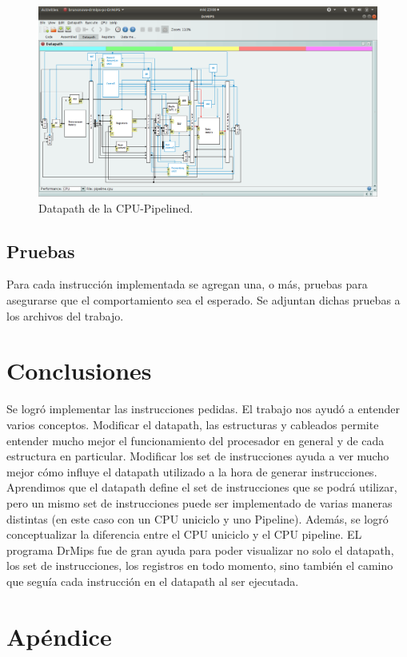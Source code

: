 \documentclass[a4paper, 12pt]{article}
\begin{document}
		\begin{figure}[!h]
	  		\centering
			    \includegraphics[width=\textwidth]{files/cpupipelined.png}
		 	 \caption{Datapath de la CPU-Pipelined.}
	  		\label{fig}
		\end{figure}	
	
	\subsection{Pruebas}
	Para cada instrucción implementada se agregan una, o más, pruebas para asegurarse que el comportamiento sea el esperado. Se adjuntan dichas pruebas a los archivos del trabajo.
	
	
	\section{Conclusiones}
	Se logró implementar las instrucciones pedidas.
	El trabajo nos ayudó a entender varios conceptos. Modificar el datapath, las estructuras y cableados permite entender mucho mejor el funcionamiento del procesador en general y de cada estructura en particular. Modificar los set de instrucciones ayuda a ver mucho mejor cómo influye el datapath utilizado a la hora de generar instrucciones. Aprendimos que el datapath define el set de instrucciones que se podrá utilizar, pero un mismo set de instrucciones puede ser implementado de varias maneras distintas (en este caso con un CPU uniciclo y uno Pipeline). Además, se logró conceptualizar la diferencia entre el CPU uniciclo y el CPU pipeline.
	EL programa DrMips fue de gran ayuda para poder visualizar no solo el datapath, los set de instrucciones, los registros en todo momento, sino también el camino que seguía cada instrucción en el datapath al ser ejecutada.

	
	\newpage
	\section{Apéndice}
\end{document}
